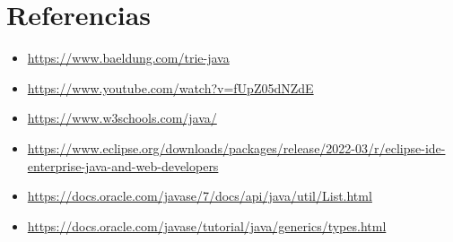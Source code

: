 \documentclass{article}
\begin{document}
	
  \newpage
  \section{Referencias}
  \begin{itemize}
    \item \url{https://www.baeldung.com/trie-java}
    \item \url{https://www.youtube.com/watch?v=fUpZ05dNZdE}
    \item \url{https://www.w3schools.com/java/}
    \item \url{https://www.eclipse.org/downloads/packages/release/2022-03/r/eclipse-ide-enterprise-java-and-web-developers}
    \item \url{https://docs.oracle.com/javase/7/docs/api/java/util/List.html}
    \item \url{https://docs.oracle.com/javase/tutorial/java/generics/types.html}
  \end{itemize}

%
%
%
			
\end{document}
